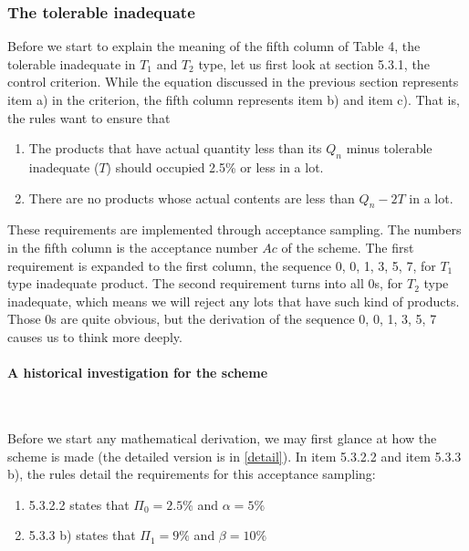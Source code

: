 \documentclass[conf]{new-aiaa}
\begin{document}
\subsubsection{The tolerable inadequate}
\label{ans2}

Before we start to explain the meaning of the fifth column of Table 4, the  tolerable inadequate in $T_1$ and $T_2$ type, let us first look at section 5.3.1, the control criterion. While the equation discussed in the previous section represents item a) in the criterion, the fifth column represents item b) and item c). That is, the rules want to ensure that \medskip

\begin{enumerate}
    \item The products that have actual quantity less than its $Q_n$ minus tolerable inadequate ($T$) should occupied 2.5\% or less in a lot.
    
    \item There are no products whose actual contents are less than $Q_n - 2T$ in a lot.
\end{enumerate}\medskip

These requirements are implemented through acceptance sampling. The numbers in the fifth column is the acceptance number $Ac$ of the scheme. The first requirement is expanded to the first column, the sequence 0, 0, 1, 3, 5, 7, for $T_1$ type inadequate product. The second requirement turns into all 0s, for $T_2$ type inadequate, which means we will reject any lots that have such kind of products. Those 0s are quite obvious, but the derivation of the sequence 0, 0, 1, 3, 5, 7 causes us to think more deeply.

\paragraph{A historical investigation for the scheme}\label{glance}\ \medskip

Before we start any mathematical derivation, we may first glance at how the scheme is made (the detailed version is in \ref{detail}). In item 5.3.2.2 and item 5.3.3 b), the rules detail the requirements for this acceptance sampling: \medskip

\begin{enumerate}
    \item 5.3.2.2 states that $\Pi_0 = 2.5\%$ and $\alpha = 5\%$
    \item 5.3.3 b) states that $\Pi_1 = 9\%$ and $\beta = 10\%$
\end{enumerate}\medskip
\end{document}
